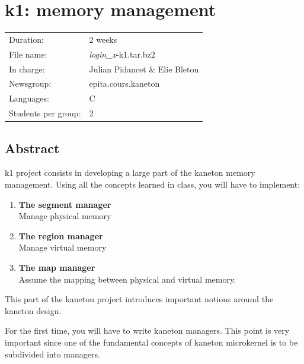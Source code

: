 
%
%

\chapter{k1: memory management}

%
%

\begin{tabular}{p{7cm}l}
  Duration: & 2 weeks \\
  File name: & {\em login\_x}-k1.tar.bz2 \\
  In charge: & Julian Pidancet \& Elie Bleton\\
  Newsgroup: & epita.cours.kaneton \\
  Languages: & C \\
  Students per group: & 2 \\
\end{tabular}

\section{Abstract}

k1 project consists in developing a large part of the kaneton memory management. Using all the concepts learned in class, you will have to implement:

\begin{enumerate}
\item
  {\bf The segment manager}\\
  Manage physical memory
\item
  {\bf The region manager}\\
  Manage virtual memory
\item
  {\bf The map manager}\\
  Assume the mapping between physical and virtual memory.\\
\end{enumerate}

This part of the kaneton project introduces important notions around the
kaneton design.

For the first time, you will have to write kaneton managers. This point is
very important since one of the fundamental concepts of kaneton microkernel
is to be subdivided into managers.

